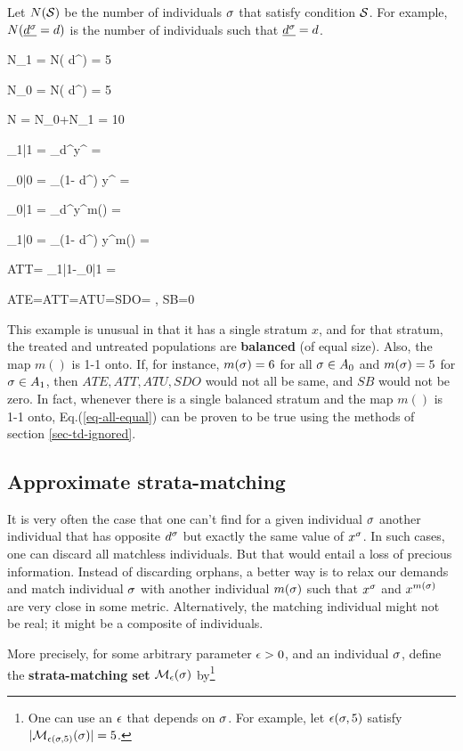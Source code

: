 Let $N({\cal S})$
be the number of individuals $\sigma$
that satisfy condition ${\cal S}$.
For example,
$N(\ul{ d^\s}= d)$
is the number of individuals
such that $\ul{ d^\s}= d$.

\beq
N_1
=
N( d^)
=
5
\eeq

\beq
N_0
=
N( d^)
=
5
\eeq

\beq
N
= N_0+N_1
=
10
\eeq



\beq
\caly_{1|1}
=
\sum_\s  d^\s y^\s
=
\eeq

\beq
\caly_{0|0}
=
\sum_\s (1- d^\s) y^\s
=
\eeq

\beq
\caly_{0|1}
=
\sum_\s  d^\s y^{m(\s)}
=
\eeq

\beq
\caly_{1|0}
=
\sum_\s (1- d^\s) y^{m(\s)}
=
\eeq

\beq
ATT=
\caly_{1|1}-\caly_{0|1}
=
\eeq

\beq
ATE=ATT=ATU=SDO=
\;,\;\; SB=0
\label{eq-all-equal}
\eeq

This example is unusual
in that it has a single
stratum $x$, and for
that stratum,
the treated and
untreated populations
are {\bf balanced} (of equal size).
Also, the map $m()$
is 1-1 onto.
If, for instance,
$m(\sigma)=6$ for all $\sigma\in A_0$
and $m(\sigma)=5$ for $\sigma\in A_1$,
then $ATE, ATT, ATU, SDO$
would not all be same, and
$SB$ would not be zero.
In fact, whenever there is a single
balanced stratum and the map $m()$
is 1-1 onto, Eq.(\ref{eq-all-equal})
can be proven to be true using
the methods of
section \ref{sec-td-ignored}.


\subsection{Approximate   strata-matching}

It is very often
the case that
one can't
find for a given
individual $\sigma$
another individual that has
opposite $ d^\sigma$ but
exactly the same value of $x^\sigma$.
In such cases, one can discard all
matchless individuals.
But that would entail a loss
of precious information.
Instead of discarding orphans,
a better way is to
relax our demands and
match individual $\sigma$
with another individual $m(\sigma)$
such that $x^\sigma$
and $x^{m(\sigma)}$ are very
close in some metric.
Alternatively, the matching
individual might
not be real; it might
be a composite
of individuals.

More precisely,
for some arbitrary
parameter $\epsilon>0$,
and an individual $\sigma$,
define
the {\bf  strata-matching set}
${\cal M}_{\epsilon}(\sigma)$ by\footnote{
One can use an $\epsilon$
that depends on $\sigma$.
For example, let $\epsilon(\sigma, 5)$
satisfy
$|{\cal M}_{\epsilon(\sigma, 5)}(\sigma)|=5$.}


